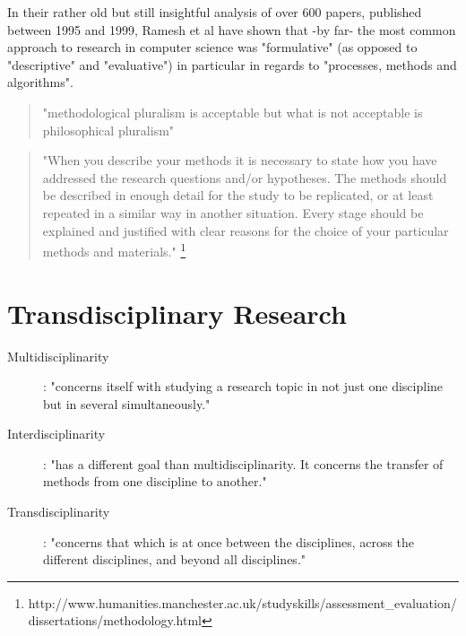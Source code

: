 In their rather old but still insightful analysis of over 600 papers, published between 1995 and 1999, Ramesh et al \citep{Ramesh2004} have shown that -by far- the most common approach to research in computer science was "formulative" (as opposed to "descriptive" and "evaluative") in particular in regards to "processes, methods and algorithms".

\begin{quote}
  "methodological pluralism is acceptable but what is not acceptable is philosophical pluralism"
\end{quote}

\begin{comment}
  What would be traditional RM in those fields?\\
  Why can I not mix and match them?\\
  what do I do now/instead?\\
  Can inter/multi/trans-disciplinary research be NOT collaborative but done by a single person?
\end{comment}

\begin{quote}
  "When you describe your methods it is necessary to state how you have addressed the research questions and/or hypotheses. The methods should be described in enough detail for the study to be replicated, or at least repeated in a similar way in another situation. Every stage should be explained and justified with clear reasons for the choice of your particular methods and materials." \footnote{http://www.humanities.manchester.ac.uk/studyskills/assessment_evaluation/dissertations/methodology.html}
\end{quote}

\section{Transdisciplinary Research}

\begin{description}
  \item [Multidisciplinarity]:	"concerns itself with studying a research topic in not just one discipline but in several simultaneously."
  \item [Interdisciplinarity]:	"has a different goal than multidisciplinarity. It concerns the transfer of methods from one discipline to another."
  \item [Transdisciplinarity]:	"concerns that which is at once between the disciplines, across the different disciplines, and beyond all disciplines."
\end{description} \citep{Nicolescu2010}

